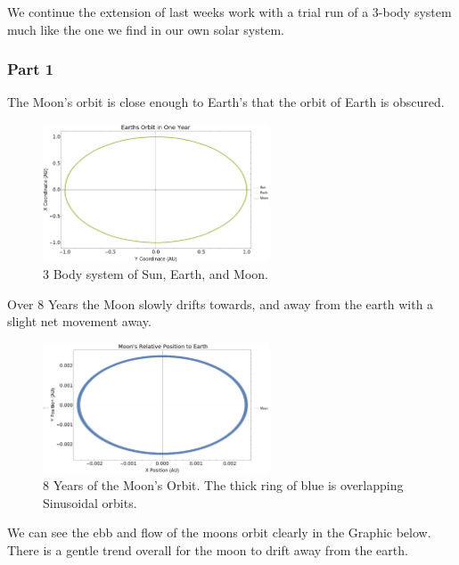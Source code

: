 \documentclass{article}
\begin{document}
We continue the extension of last weeks work with a trial run of a 3-body system much like the one we find in our own solar system.

\subsubsection{Part 1}

The Moon's orbit is close enough to Earth's that the orbit of Earth is obscured.

\begin{figure}[!htb]
	\begin{center}
		\includegraphics[width=0.6\textwidth]{images/p1-1a.pdf}
	\end{center}
	\caption{3 Body system of Sun, Earth, and Moon.}
\label{fig:qual}
\end{figure}
\FloatBarrier

Over 8 Years the Moon slowly drifts towards, and away from the earth with a slight net movement away.

\begin{figure}[!htb]
	\begin{center}
		\includegraphics[width=0.6\textwidth]{images/p1-1b.pdf}
	\end{center}
	\caption{8 Years of the Moon's Orbit. The thick ring of blue is overlapping Sinusoidal orbits.}
\label{fig:qual}
\end{figure}
\FloatBarrier

We can see the ebb and flow of the moons orbit clearly in the Graphic below. There is a gentle trend overall for the moon to drift away from the earth.
\end{document}
